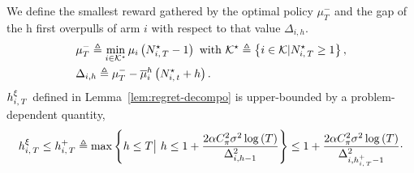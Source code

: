 \begin{lemma}\label{lem:UB-OP-PD}
We define the smallest reward gathered by the optimal policy $\mu^-_T$ and the gap of the h first overpulls of arm $i$ with respect to that value $\Delta_{i,h}$.
\begin{align*}
&\mu^-_T\triangleq \min_{i \in \mathcal{K}^\star} \mu_i \left(N_{i,\,T}^\star -1\right) \text{ with }\mathcal{K}^\star \triangleq\left\{ i \in \mathcal{K} | N_{i,\,T}^\star \geq 1 \right\}, \\
&\Delta_{i,h} \triangleq \mu^-_T- \overline{\mu}_i^h\left( N_{i,\,t}^\star+h \right).
\end{align*}
$h_{i,\,T}^\xi$ defined in Lemma~\ref{lem:regret-decompo} is upper-bounded by a problem-dependent quantity,
\begin{equation*}
h_{i,\,T}^\xi \leq   h_{i,\,T}^+  \triangleq \max \left\{ h \leq T \big| \ h \leq  1 + \frac{2\alpha C_\pi^2 \sigma^2 \log \left(T\right)}{\Delta_{i,h-1}^2} \right\}  \leq  1 + \frac{2\alpha C_\pi^2 \sigma^2 \log \left(T\right)}{\Delta_{i,h_{i,\,T}^+-1}^2}\cdot
\end{equation*}
\end{lemma}
